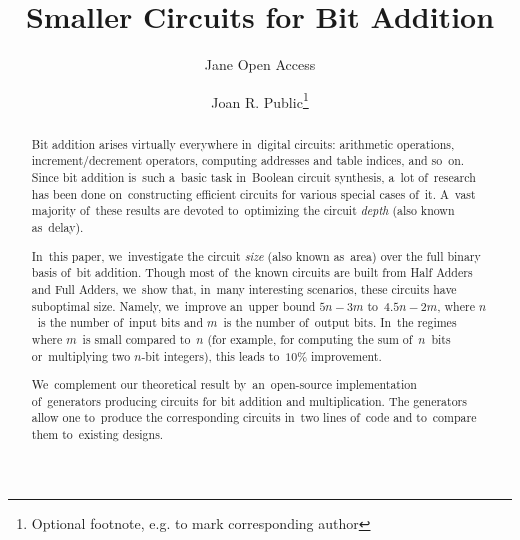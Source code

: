 \documentclass[a4paper, UKenglish, cleveref, autoref,  thm-restate, anonymous]{lipics-v2021}
\title{Smaller Circuits for Bit Addition} %
\author{Jane {Open Access}}{Dummy University Computing Laboratory, [optional: Address], Country \and My second affiliation, Country \and \url{http://www.myhomepage.edu} }{johnqpublic@dummyuni.org}{https://orcid.org/0000-0002-1825-0097}{(Optional) author-specific funding acknowledgements}%
\author{Joan R. Public\footnote{Optional footnote, e.g. to mark corresponding author}}{Department of Informatics, Dummy College, [optional: Address], Country}{joanrpublic@dummycollege.org}{[orcid]}{[funding]}
\begin{document}
    \maketitle

    \begin{abstract}
        Bit addition arises virtually everywhere in~digital circuits:
        arithmetic operations,
        increment/decrement operators,
        computing addresses and table indices, and so~on.
        Since bit addition is~such a~basic task in~Boolean circuit synthesis,
        a~lot of~research has been done on~constructing efficient circuits
        for various special cases of~it. A~vast majority of~these results are devoted to~optimizing the circuit \emph{depth} (also known as~delay).

        In~this paper, we~investigate the circuit \emph{size} (also known as~area)
        over the full binary basis of~bit addition. Though most of~the known circuits are built from Half Adders and Full Adders,
        we~show that, in~many interesting scenarios, these circuits have suboptimal size.
        Namely, we~improve an~upper bound $5n-3m$ to~$4.5n-2m$,
        where $n$~is the number of~input bits and $m$~is the number of~output bits.
        In~the regimes where $m$~is small compared to~$n$
        (for example, for computing the sum
        of~$n$~bits or~multiplying two $n$-bit integers),
        this leads to~$10\%$ improvement.

        We~complement our theoretical result by~an~open-source implementation
        of~generators producing circuits for bit addition and multiplication.
        The generators allow one to~produce the corresponding circuits
        in~two lines of~code and to~compare them to~existing designs.
    \end{abstract}

    \clearpage
\end{document}

